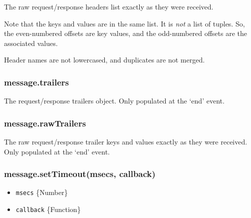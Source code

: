 The raw request/response headers list exactly as they were received.

Note that the keys and values are in the same list. It is \emph{not} a
list of tuples. So, the even-numbered offsets are key values, and the
odd-numbered offsets are the associated values.

Header names are not lowercased, and duplicates are not merged.

\begin{Shaded}
\begin{Highlighting}[]
\CommentTok{//}
\CommentTok{// [ 'user-agent',}
\CommentTok{//   '*/*' ]}
\NormalTok{(}\NormalTok{);}
\end{Highlighting}
\end{Shaded}

\subsubsection{message.trailers}\label{message.trailers}

The request/response trailers object. Only populated at the `end' event.

\subsubsection{message.rawTrailers}\label{message.rawtrailers}

The raw request/response trailer keys and values exactly as they were
received. Only populated at the `end' event.

\subsubsection{message.setTimeout(msecs,
callback)}\label{message.settimeoutmsecs-callback}

\begin{itemize}
\itemsep1pt\parskip0pt
\item
  \texttt{msecs} \{Number\}
\item
  \texttt{callback} \{Function\}
\end{itemize}

